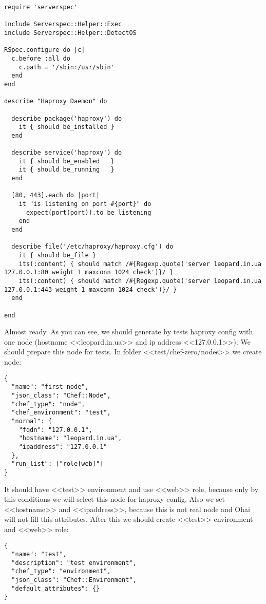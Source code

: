 \begin{lstlisting}[label=lst:testing-chef-zero19]
require 'serverspec'

include Serverspec::Helper::Exec
include Serverspec::Helper::DetectOS

RSpec.configure do |c|
  c.before :all do
    c.path = '/sbin:/usr/sbin'
  end
end

describe "Haproxy Daemon" do

  describe package('haproxy') do
    it { should be_installed }
  end

  describe service('haproxy') do
    it { should be_enabled   }
    it { should be_running   }
  end

  [80, 443].each do |port|
    it "is listening on port #{port}" do
      expect(port(port)).to be_listening
    end
  end

  describe file('/etc/haproxy/haproxy.cfg') do
    it { should be_file }
    its(:content) { should match /#{Regexp.quote('server leopard.in.ua 127.0.0.1:80 weight 1 maxconn 1024 check')}/ }
    its(:content) { should match /#{Regexp.quote('server leopard.in.ua 127.0.0.1:443 weight 1 maxconn 1024 check')}/ }
  end

end
\end{lstlisting}

Almost ready. As you can see, we should generate by tests haproxy config with one node (hostname <<leopard.in.ua>> and ip address <<127.0.0.1>>). We should prepare this node for tests. In folder <<test/chef-zero/nodes>> we create node:

\begin{lstlisting}[label=lst:testing-chef-zero20]
{
  "name": "first-node",
  "json_class": "Chef::Node",
  "chef_type": "node",
  "chef_environment": "test",
  "normal": {
    "fqdn": "127.0.0.1",
    "hostname": "leopard.in.ua",
    "ipaddress": "127.0.0.1"
  },
  "run_list": ["role[web]"]
}
\end{lstlisting}

It should have <<test>> environment and use <<web>> role, because only by this conditions we will select this node for haproxy config. Also we set <<hostname>> and <<ipaddress>>, because this is not real node and Ohai will not fill this attributes. After this we should create <<test>> environment and <<web>> role:

\begin{lstlisting}[label=lst:testing-chef-zero21]
{
  "name": "test",
  "description": "test environment",
  "chef_type": "environment",
  "json_class": "Chef::Environment",
  "default_attributes": {}
}
\end{lstlisting}

